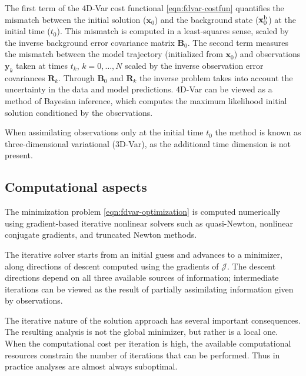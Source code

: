 \documentclass[final,sort&compress]{elsarticle}
\newcommand{\Jfunc}{\mathcal J }
\newcommand{\B}{\mathbf{B}}
\newcommand{\R}{\mathbf{R}}
\newcommand{\x}{   \mathbf{x} }
\newcommand{\xb}{ \mathbf{x}^{\rm b} }
\newcommand{\y}{ \mathbf{y} }
\begin{document}
The first term of the 4D-Var cost functional \eqref{eqn:fdvar-costfun} quantifies the mismatch between the initial solution ($\x_0$) 
and the background state ($\xb_0$) at the initial time ($t_0$). 
This mismatch is computed in a least-squares sense, scaled by the inverse background error covariance matrix $\B_0$. 
The second term measures the mismatch between the model trajectory (initialized from $\x_0$) and observations $\y_k$
taken at times $t_k$, $k=0,\dots,N$ scaled by the inverse observation error covariances $\R_k$.
Through $\B_0$ and $\R_k$ the inverse problem takes into account the uncertainty in the data and model predictions. 
4D-Var can be viewed as a method of Bayesian inference, which computes the maximum likelihood initial solution 
conditioned by the observations.

When assimilating observations only at the initial time $t_0$ the method is known as three-dimensional variational 
(3D-Var), as the additional time dimension is not present. 

\subsection{Computational aspects}


The minimization problem \eqref{eqn:fdvar-optimization} is computed numerically using
gradient-based iterative nonlinear solvers such as
quasi-Newton, nonlinear conjugate gradients, and truncated Newton methods. 

The iterative solver starts from an initial guess and advances to a minimizer,
along directions of descent computed using the gradients of $\Jfunc$. 
The descent directions depend on all three available sources of information;
intermediate iterations
can be viewed as the result of partially assimilating information given by observations.

The iterative nature of the solution approach has several important consequences.
The resulting analysis is not the global minimizer, but rather is a local one.
When the computational cost per iteration is high, the available
computational resources constrain the number of iterations that can be performed. 
Thus in practice analyses are almost always suboptimal.
\end{document}
